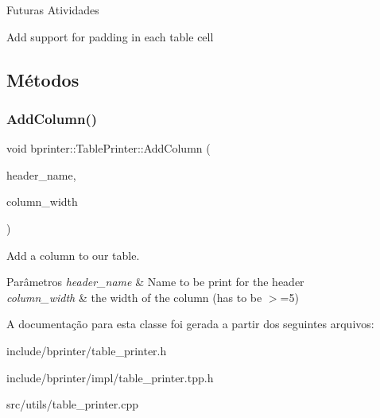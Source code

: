 \begin{DoxyRefDesc}{Futuras Atividades}
\item[\hyperlink{todo__todo000001}{Futuras Atividades}]Add support for padding in each table cell \end{DoxyRefDesc}


\subsection{Métodos}
\mbox{\label{classbprinter_1_1TablePrinter_a271d4d46ec64e34f3b00093d0971101d}} 
\subsubsection{\texorpdfstring{Add\+Column()}{AddColumn()}}
{\footnotesize\ttfamily void bprinter\+::\+Table\+Printer\+::\+Add\+Column (\begin{DoxyParamCaption}\item[{const std\+::string \&}]{header\+\_\+name,  }\item[{int}]{column\+\_\+width }\end{DoxyParamCaption})}



Add a column to our table. 


\begin{DoxyParams}{Parâmetros}
{\em header\+\_\+name} & Name to be print for the header \\
\hline
{\em column\+\_\+width} & the width of the column (has to be $>$=5) \\
\hline
\end{DoxyParams}


A documentação para esta classe foi gerada a partir dos seguintes arquivos\+:\begin{DoxyCompactItemize}
\item 
include/bprinter/table\+\_\+printer.\+h\item 
include/bprinter/impl/table\+\_\+printer.\+tpp.\+h\item 
src/utils/table\+\_\+printer.\+cpp\end{DoxyCompactItemize}

